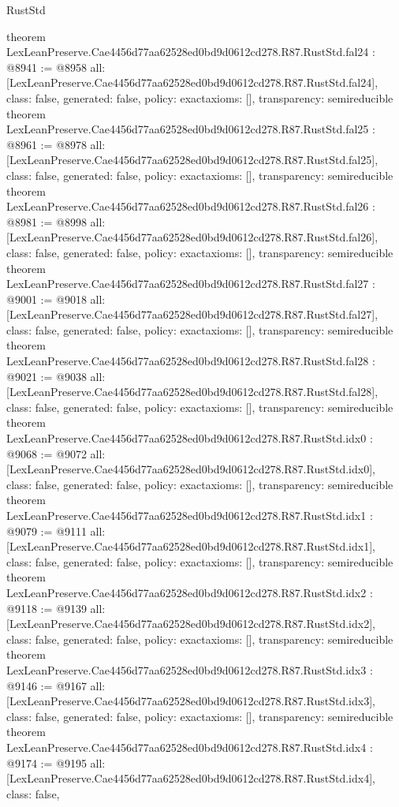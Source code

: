 \begin{lexlean}{RustStd}
\begin{coremodule}
{}
theorem LexLeanPreserve.Cae4456d77aa62528ed0bd9d0612cd278.R87.RustStd.fal24 : @8941 := @8958 {
  all: [LexLeanPreserve.Cae4456d77aa62528ed0bd9d0612cd278.R87.RustStd.fal24],
  class: false,
  generated: false,
  policy: exact{axioms: []},
  transparency: semireducible
}
theorem LexLeanPreserve.Cae4456d77aa62528ed0bd9d0612cd278.R87.RustStd.fal25 : @8961 := @8978 {
  all: [LexLeanPreserve.Cae4456d77aa62528ed0bd9d0612cd278.R87.RustStd.fal25],
  class: false,
  generated: false,
  policy: exact{axioms: []},
  transparency: semireducible
}
theorem LexLeanPreserve.Cae4456d77aa62528ed0bd9d0612cd278.R87.RustStd.fal26 : @8981 := @8998 {
  all: [LexLeanPreserve.Cae4456d77aa62528ed0bd9d0612cd278.R87.RustStd.fal26],
  class: false,
  generated: false,
  policy: exact{axioms: []},
  transparency: semireducible
}
theorem LexLeanPreserve.Cae4456d77aa62528ed0bd9d0612cd278.R87.RustStd.fal27 : @9001 := @9018 {
  all: [LexLeanPreserve.Cae4456d77aa62528ed0bd9d0612cd278.R87.RustStd.fal27],
  class: false,
  generated: false,
  policy: exact{axioms: []},
  transparency: semireducible
}
theorem LexLeanPreserve.Cae4456d77aa62528ed0bd9d0612cd278.R87.RustStd.fal28 : @9021 := @9038 {
  all: [LexLeanPreserve.Cae4456d77aa62528ed0bd9d0612cd278.R87.RustStd.fal28],
  class: false,
  generated: false,
  policy: exact{axioms: []},
  transparency: semireducible
}
theorem LexLeanPreserve.Cae4456d77aa62528ed0bd9d0612cd278.R87.RustStd.idx0 : @9068 := @9072 {
  all: [LexLeanPreserve.Cae4456d77aa62528ed0bd9d0612cd278.R87.RustStd.idx0],
  class: false,
  generated: false,
  policy: exact{axioms: []},
  transparency: semireducible
}
theorem LexLeanPreserve.Cae4456d77aa62528ed0bd9d0612cd278.R87.RustStd.idx1 : @9079 := @9111 {
  all: [LexLeanPreserve.Cae4456d77aa62528ed0bd9d0612cd278.R87.RustStd.idx1],
  class: false,
  generated: false,
  policy: exact{axioms: []},
  transparency: semireducible
}
theorem LexLeanPreserve.Cae4456d77aa62528ed0bd9d0612cd278.R87.RustStd.idx2 : @9118 := @9139 {
  all: [LexLeanPreserve.Cae4456d77aa62528ed0bd9d0612cd278.R87.RustStd.idx2],
  class: false,
  generated: false,
  policy: exact{axioms: []},
  transparency: semireducible
}
theorem LexLeanPreserve.Cae4456d77aa62528ed0bd9d0612cd278.R87.RustStd.idx3 : @9146 := @9167 {
  all: [LexLeanPreserve.Cae4456d77aa62528ed0bd9d0612cd278.R87.RustStd.idx3],
  class: false,
  generated: false,
  policy: exact{axioms: []},
  transparency: semireducible
}
theorem LexLeanPreserve.Cae4456d77aa62528ed0bd9d0612cd278.R87.RustStd.idx4 : @9174 := @9195 {
  all: [LexLeanPreserve.Cae4456d77aa62528ed0bd9d0612cd278.R87.RustStd.idx4],
  class: false,
}
\end{coremodule}
\end{lexlean}
